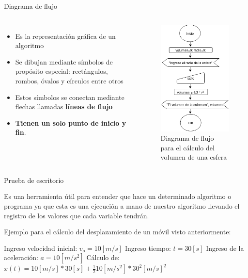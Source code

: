 \documentclass[xcolor=pdftex,table,11pt]{beamer}
\begin{document}
\begin{frame}{Diagrama de flujo}
\begin{columns}
 \begin{itemize}
   
     	\item<1-> Es la representación gráfica de un algoritmo
        \item<2-> Se dibujan mediante símbolos de propósito especial: rectángulos, rombos, óvalos y círculos entre otros
 		\item<3-> Estos símbolos se conectan mediante flechas llamadas \textbf{líneas de flujo}
 		\item<4-> \textbf{Tienen un solo punto de inicio y fin}.
   \end{itemize}
 \begin{figure}
\includegraphics[scale=0.4]{../img/exported/volumen_esfera.png}
\caption{Diagrama de flujo para el cálculo del volumen de una esfera}
\end{figure}
\end{columns}
\end{frame}


\begin{frame}{Prueba de escritorio}

\begin{block}{}
Es una herramienta útil para entender que hace un determinado algoritmo  o programa ya que esta es una ejecución a mano de nuestro algoritmo llevando el registro de los valores que cada variable tendrán.
\end{block}
Ejemplo para el cálculo del desplazamiento de un móvil visto anteriormente:

Ingreso velocidad inicial: $v_o=10 [m/s]$ \newline
Ingreso tiempo: $t=30 [s]$ \newline
Ingreso de la aceleración: $a=10 [m/s^2]$ \newline
Cálculo de: $x(t)=10[m/s]*30 [s] + \frac{1}{2} 10 [m/s^2] * 30^2 {[m/s]}^2$\newline

\end{frame}
\end{document}
